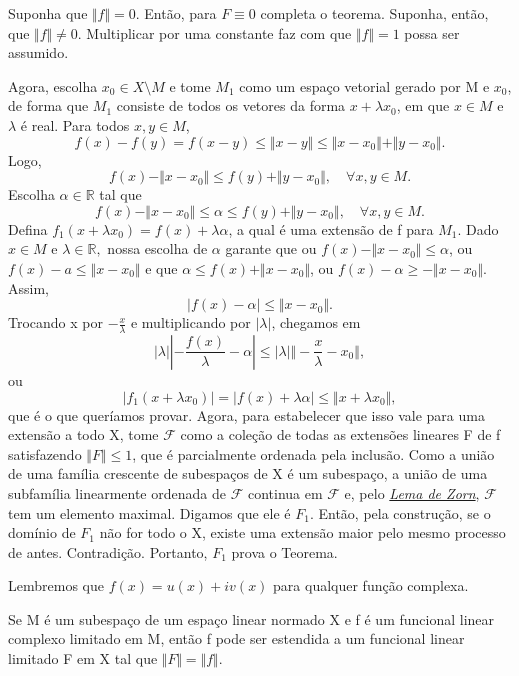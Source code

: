 \documentclass[MeasureTheory/measure_theory.tex]{subfiles}
\begin{document}
\begin{proof*}
	Suponha que \(\Vert f \Vert = 0\). Então, para \(F\equiv 0\) completa o teorema. Suponha, então, que \(\Vert f \Vert\neq 0\). Multiplicar por uma constante faz com que \(\Vert f \Vert = 1\) possa ser assumido.

	Agora, escolha \(x_{0}\in X\setminus{M}\) e tome \(M_1\) como um espaço vetorial gerado por M e \(x_{0}\), de forma que \(M_1\) consiste de todos os vetores da forma \(x+\lambda x_{0}\), em que \(x\in M\) e \(\lambda \) é real. Para todos \(x, y\in M\),
	\[
		f(x) - f(y) = f(x-y) \leq \Vert x-y \Vert \leq \Vert x-x_{0} \Vert + \Vert y - x_{0} \Vert.
	\]
	Logo,
	\[
		f(x)-\Vert x-x_{0} \Vert \leq f(y) + \Vert y-x_{0} \Vert,\quad \forall x, y\in M.
	\]
	Escolha \(\alpha \in \mathbb{R}\) tal que
	\[
		f(x) - \Vert x-x_{0} \Vert \leq \alpha \leq f(y) + \Vert y-x_{0} \Vert,\quad \forall x, y\in M.
	\]
	Defina \(f_1(x+\lambda x_{0}) = f(x) + \lambda \alpha \), a qual é uma extensão de f para \(M_1\). Dado \(x\in M \) e \(\lambda \in \mathbb{R},\) nossa escolha de \(\alpha\) garante que ou \(f(x) - \Vert x - x_{0} \Vert \leq \alpha \), ou \(f(x) - a \leq \Vert x-x_{0} \Vert\) e que
	\(\alpha \leq f(x) + \Vert x-x_{0} \Vert\), ou \(f(x) - \alpha \geq -\Vert x-x_{0} \Vert\). Assim,
	\[
		|f(x) - \alpha | \leq \Vert x-x_{0} \Vert.
	\]
	Trocando x por \(-\frac{x}{\lambda }\) e multiplicando por \(|\lambda |\), chegamos em
	\[
		|\lambda ||-\frac{f(x)}{\lambda }-\alpha | \leq |\lambda | \Vert -\frac{x}{\lambda }-x_{0} \Vert,
	\]
	ou
	\[
		|f_1(x+\lambda x_{0})| = |f(x) + \lambda \alpha |\leq \Vert x + \lambda x_{0} \Vert,
	\]
	que é o que queríamos provar. Agora, para estabelecer que isso vale para uma extensão a todo X, tome \(\mathcal{F}\) como a coleção de todas as extensões lineares F de f satisfazendo \(\Vert F \Vert\leq 1\), que é parcialmente ordenada pela inclusão.
	Como a união de uma família crescente de subespaços de X é um subespaço, a união de uma subfamília linearmente ordenada de \(\mathcal{F}\) continua em \(\mathcal{F}\) e, pelo \hyperlink{zornn}{\textit{Lema de Zorn}}, \(\mathcal{F}\) tem um elemento maximal.
	Digamos que ele é \(F_1\). Então, pela construção, se o domínio de \(F_1\) não for todo o X, existe uma extensão maior pelo mesmo processo de antes. Contradição. Portanto, \(F_1\) prova o Teorema. \qedsymbol
\end{proof*}
Lembremos que \(f(x) = u(x) + iv(x)\) para qualquer função complexa.
\hypertarget{complex_hahn_banach}{
	\begin{theorem*}
		Se M é um subespaço de um espaço linear normado X e f é um funcional linear complexo limitado em M, então f pode ser estendida a um funcional linear limitado F em X tal que \(\Vert F \Vert = \Vert f \Vert\).
	\end{theorem*}
}
\end{document}
